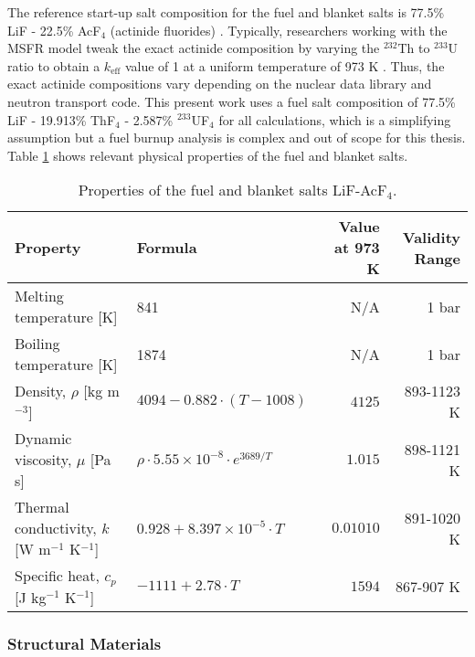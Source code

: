 The reference start-up salt composition for the fuel and blanket salts is
77.5\% LiF - 22.5\% AcF$_4$ (actinide fluorides)
\cite{merle-lucotte_launching_2011}. Typically, researchers working with the
\gls{MSFR}
model tweak the exact actinide composition by varying the $^{232}$Th to
$^{233}$U ratio to obtain a $k_{\text{eff}}$ value of 1 at a uniform
temperature of 973 K \cite{brovchenko_neutronic_2019}. Thus, the exact
actinide compositions vary depending on
the nuclear data library and neutron transport code. This present work uses
a fuel salt composition of 77.5\% LiF - 19.913\% ThF$_4$ - 2.587\%
$^{233}$UF$_4$ for all calculations, which is a simplifying assumption but a
fuel burnup analysis is complex and out of scope for this thesis. Table
\ref{table:prip} shows relevant physical properties of the fuel and blanket
salts.
%
\begin{table}[htb!]
\small
\centering
\caption{Properties of the fuel and blanket salts LiF-AcF$_4$.}
\begin{tabular}{l l r r}
\toprule
Property & Formula & {Value at 973 K} & Validity Range\\
\midrule
Melting temperature [K] & 841 & {N/A} & 1 bar \\
Boiling temperature [K] & 1874 & {N/A} & 1 bar \\
Density, $\rho$ [kg m$^{-3}$] & $4094-0.882 \cdot (T-1008)$ & $4125$ & 893-1123 K \\
Dynamic viscosity, $\mu$ [Pa s] & $\rho \cdot 5.55 \times 10^{-8} \cdot e^{3689/T}$ & $1.015$ & 898-1121 K \\
Thermal conductivity, $k$ [W m$^{-1}$ K$^{-1}$] & $0.928+8.397 \times 10^{-5} \cdot T$ & $0.01010$ & 891-1020 K \\
Specific heat, $c_p$ [J kg$^{-1}$ K$^{-1}$] & $-1111+2.78\cdot T$ & $1594$ & 867-907 K \\
\bottomrule
\end{tabular}
\label{table:prip}
\end{table}

\subsubsection{Structural Materials}


